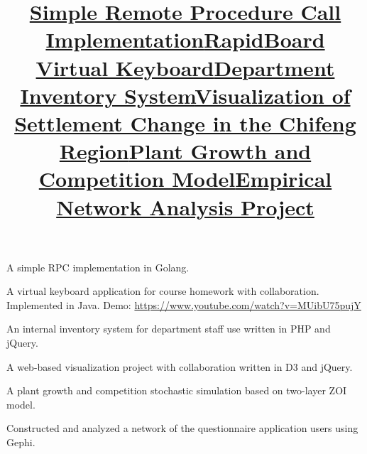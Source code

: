 \begin{resume}
\title{\textbf{\href{https://github.com/adorazhang/SimpleRPC}{Simple Remote Procedure Call Implementation}}}
\begin{position}
A simple RPC implementation in Golang.
\end{position}

\title{\textbf{\href{https://www.youtube.com/watch?v=MUibU75pujY}{RapidBoard Virtual Keyboard}}}
\begin{position}
A virtual keyboard application for course homework with collaboration. Implemented in Java.
Demo: \url{https://www.youtube.com/watch?v=MUibU75pujY}
\end{position}

\title{\textbf{\href{http://intranet.cs.pitt.edu/inv.new/}{Department Inventory System}}}
\begin{position}
 An internal inventory system for department staff use written in PHP and jQuery.
\end{position}


\title{\textbf{\href{https://github.com/adorazhang/CodeSnippets/tree/master/visualization-project}{Visualization of Settlement Change in the Chifeng Region}}}
\begin{position}
A web-based visualization project with collaboration written in D3 and jQuery.
\end{position}


\title{\textbf{\href{https://github.com/adorazhang/CodeSnippets/blob/master/growth-model-root-competition.nlogo}{Plant Growth and Competition Model}}}
\begin{position}
 A plant growth and competition stochastic simulation based on two-layer ZOI model.
\end{position}

%

\title{\textbf{\href{http://github.com/adorazhang/CodeSnippets/blob/master/Empirical\%20Network\%20Analysis.pdf}{Empirical Network Analysis Project}}}
\begin{position}
 Constructed and analyzed a network of the questionnaire application users using Gephi.
\end{position}


\end{resume}
